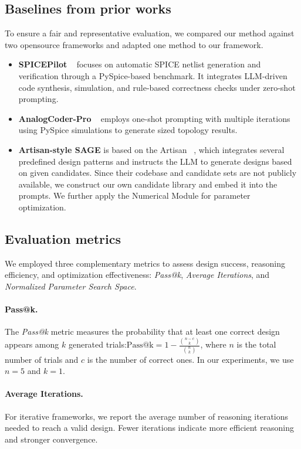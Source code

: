 \subsection{Baselines from prior works}

To ensure a fair and representative evaluation, we compared our method against two opensource frameworks and adapted one method to our framework.


\begin{itemize}
    \item \textbf{SPICEPilot} ~\cite{vungarala2024spicepilot} focuses on automatic SPICE netlist generation and verification through a PySpice-based benchmark. It integrates LLM-driven code synthesis, simulation, and rule-based correctness checks under zero-shot prompting.
    \item \textbf{AnalogCoder-Pro} ~\cite{lai2025analogcoder} employs one-shot prompting with multiple iterations using PySpice simulations to generate sized topology results.
    \item \textbf{Artisan-style SAGE} is based on the Artisan ~\cite{chen2024artisan}, which integrates several predefined design patterns and instructs the LLM to generate designs based on given candidates. Since their codebase and candidate sets are not publicly available, we construct our own candidate library and embed it into the prompts. We further apply the Numerical Module for parameter optimization.
\end{itemize}
\subsection{Evaluation metrics}

We employed three complementary metrics to assess design success, reasoning efficiency, and optimization effectiveness: \textit{Pass@k}, \textit{Average Iterations}, and \textit{Normalized Parameter Search Space}.

\paragraph{Pass@k.}
The \textit{Pass@k} metric measures the probability that at least one correct design appears among $k$ generated trials:$\text{Pass@k} = 1 - \frac{\binom{n-c}{k}}{\binom{n}{k}}$,
where $n$ is the total number of trials and $c$ is the number of correct ones.
In our experiments, we use $n = 5$ and $k = 1$.

\paragraph{Average Iterations.}
For iterative frameworks, we report the average number of reasoning iterations needed to reach a valid design. Fewer iterations indicate more efficient reasoning and stronger convergence.

